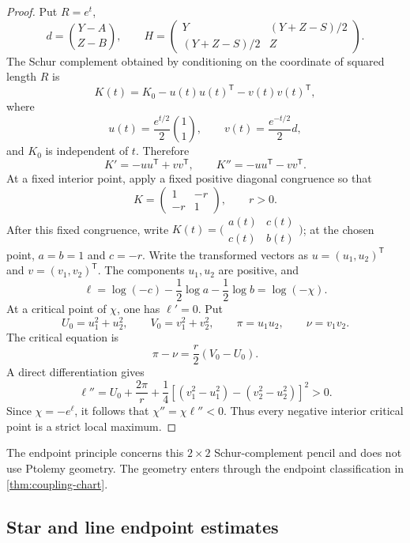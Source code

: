 \documentclass[11pt]{amsart}
\theoremstyle{definition}
\theoremstyle{remark}
\begin{document}
\begin{proof}
Put \(R=e^t\),
\[
 d=\binom{Y-A}{Z-B},
 \qquad
 H=\begin{pmatrix}Y&(Y+Z-S)/2\\(Y+Z-S)/2&Z\end{pmatrix}.
\]
The Schur complement obtained by conditioning on the coordinate of squared length \(R\) is
\begin{equation}\label{eq:schur-pencil}
 K(t)=K_0-u(t)u(t)^{\mathsf T}-v(t)v(t)^{\mathsf T},
\end{equation}
where
\[
 u(t)=\frac{e^{t/2}}2\binom11,
 \qquad
 v(t)=\frac{e^{-t/2}}2d,
\]
and \(K_0\) is independent of \(t\). Therefore
\[
 K'=-uu^{\mathsf T}+vv^{\mathsf T},
 \qquad
 K''=-uu^{\mathsf T}-vv^{\mathsf T}.
\]
At a fixed interior point, apply a fixed positive diagonal congruence
so that
\[
 K=\begin{pmatrix}1&-r\\-r&1\end{pmatrix},
 \qquad r>0.
\]
After this fixed congruence, write
$K(t)=\bigl(\begin{smallmatrix}a(t)&c(t)\\c(t)&b(t)\end{smallmatrix}\bigr)$;
at the chosen point, $a=b=1$ and $c=-r$. Write the transformed vectors
as \(u=(u_1,u_2)^{\mathsf T}\) and \(v=(v_1,v_2)^{\mathsf T}\). The
components \(u_1,u_2\) are positive, and
\[
 \ell=\log(-c)-\frac12\log a-\frac12\log b=\log(-\chi).
\]
At a critical point of \(\chi\), one has \(\ell'=0\). Put
\[
 U_0=u_1^2+u_2^2,
 \qquad
 V_0=v_1^2+v_2^2,
 \qquad
 \pi=u_1u_2,
 \qquad
 \nu=v_1v_2.
\]
The critical equation is
\[
 \pi-\nu=\frac r2(V_0-U_0).
\]
A direct differentiation gives
\begin{equation}\label{eq:ell-second}
 \ell''
 =U_0+\frac{2\pi}{r}
 +\frac14\left[(v_1^2-u_1^2)-(v_2^2-u_2^2)\right]^2>0.
\end{equation}
Since \(\chi=-e^{\ell}\), it follows that \(\chi''=\chi\ell''<0\). Thus every negative interior critical point is a strict local maximum.
\end{proof}

The endpoint principle concerns this $2\times2$ Schur-complement pencil and does not use Ptolemy geometry. The geometry enters through the endpoint classification in \cref{thm:coupling-chart}.

\subsection{Star and line endpoint estimates}
\end{document}
